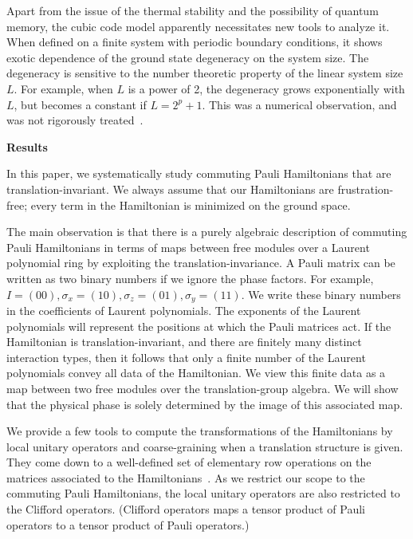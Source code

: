 \documentclass[letterpaper,12pt]{amsart}
\theoremstyle{definition} \newtheorem{defn}{Definition}
\theoremstyle{definition} \newtheorem{rem}{Remark}
\theoremstyle{definition} \newtheorem{example}{Example}
\begin{document}
Apart from the issue of the thermal stability and the possibility of quantum memory,
the cubic code model apparently necessitates new tools to analyze it.
When defined on a finite system with periodic boundary conditions,
it shows exotic dependence of the ground state degeneracy on the system size.
The degeneracy is sensitive to the number theoretic property of
the linear system size $L$. For example, when $L$ is a power of 2,
the degeneracy grows exponentially with $L$, but becomes a constant if $L = 2^p +1$.
This was a numerical observation, and was not rigorously treated~\cite{Haah2011Local}.

\begin{center}
{\bf Results}
\end{center}

In this paper, we systematically study commuting Pauli Hamiltonians
that are translation-invariant.
We always assume that our Hamiltonians are frustration-free;
every term in the Hamiltonian is minimized on the ground space.


The main observation is that there is a purely algebraic description of
commuting Pauli Hamiltonians in terms of maps between 
free modules over a Laurent polynomial ring by exploiting the translation-invariance.
A Pauli matrix can be written as two binary numbers if we ignore the phase factors.
For example, $I = (00), \sigma_x=(10), \sigma_z = (01), \sigma_y=(11)$.
We write these binary numbers in the coefficients of Laurent polynomials.
The exponents of the Laurent polynomials will represent the positions at which the Pauli matrices act.
If the Hamiltonian is translation-invariant, and there are finitely many distinct interaction types,
then it follows that only a finite number of the Laurent polynomials convey all data of the Hamiltonian.
We view this finite data as a map between two free modules over the translation-group algebra.
We will show that the physical phase is solely determined by the image of this associated map.



We provide a few tools to compute the transformations of the Hamiltonians 
by local unitary operators and coarse-graining when a translation structure is given.
They come down to a well-defined set of elementary row operations
on the matrices associated to the Hamiltonians~\cite{CalderbankRainsShorEtAl1997Quantum,KitaevShenVyalyi2002CQC}.
As we restrict our scope to the commuting Pauli Hamiltonians,
the local unitary operators are also restricted to the Clifford operators.
(Clifford operators maps a tensor product of Pauli operators to 
a tensor product of Pauli operators.)
\end{document}
